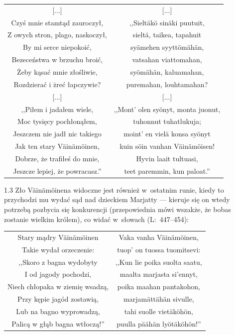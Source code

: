 \documentclass[11pt,a4paper,twoside]{report}
\begin{document}
{\centering
\small
\begin{longtable}{c c}
{[...]} & {[...]}\\
Czyś mnie stamtąd zauroczył, & ,,Sieltäkö sinäki puutuit,\\
Z owych stron, plago, naskoczył, & sieltä, taikea, tapahuit\\
By mi serce niepokoić, & syämehen syyttömähän,\\
Bezeceństwa w brzuchu broić, & vatsahan viattomahan,\\
Żeby kąsać mnie złośliwie, & syömähän, kaluamahan,\\
Rozdzierać i żreć łapczywie? & puremahan, louhtamahan?\\
{[...]} & {[...]}\\
,,Piłem i jadałem wiele, & ,,Mont' olen syönyt, monta juonut,\\
Moc tysięcy pochłonąłem, & tuhonnut tuhatlukuja;\\
Jeszczem nie jadł nic takiego & moint' en vielä konsa syönyt\\
Jak ten stary Väinämöinen, & kuin söin vanhan Väinämöisen!\\
Dobrze, że trafiłeś do mnie, & Hyvin laait tultuasi,\\
Jeszcze lepiej, że powracasz.'' & teet paremmin, kun paloat.''
\end{longtable}
}
\begin{spacing}{1.3}
Zło  Väinämöinena widoczne jest również w~ostatnim runie, kiedy to przychodzi mu wydać sąd nad dzieckiem Marjatty --- kieruje się on wtedy potrzebą pozbycia się konkurencji (przepowiednia mówi wszakże, że bobas zostanie wielkim królem), co widać w~słowach (L:~447--454):
\end{spacing}

{\centering
\small
\begin{longtable}{c c}
Stary mądry Väinämöinen & Vaka vanha Väinämöinen,\\
Takie wydał orzeczenie: & tuop' on tuossa tuomitsevi:\\
,,Skoro z bagna wydobyty & ,,Kun lie poika suolta saatu,\\
I od jagody pochodzi, & maalta marjasta si'ennyt,\\
Niech chłopaka w ziemię wsadzą, & poika maahan pantakohon,\\
Przy kępie jagód zostawią, & marjamättähän sivulle,\\
Lub na bagno wyprowadzą, & tahi suolle vietäköhön,\\
Palicą w głąb bagna wtłoczą!'' & puulla päähän lyötäköhön!''\\
\end{longtable}
}
\vspace*{0.5\baselineskip}
\end{document}
